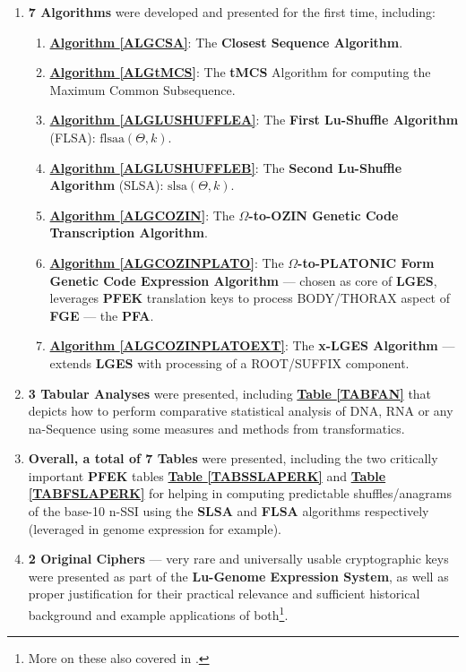 \documentclass[a4paper, 18pt]{book} %
\begin{document}
\begin{enumerate}
{ }
\item{\textbf{7 Algorithms} were developed and presented for the first time, including:
	\begin{enumerate}
	\item \textbf{\hyperref[ALGCSA]{Algorithm \ref{ALGCSA}}}: The \textbf{Closest Sequence Algorithm}.
	\item \textbf{\hyperref[ALGtMCS]{Algorithm \ref{ALGtMCS}}}: The \textbf{tMCS} Algorithm for computing the Maximum Common Subsequence.
		\item \textbf{\hyperref[ALGLUSHUFFLEA]{Algorithm \ref{ALGLUSHUFFLEA}}}: The \textbf{First Lu-Shuffle Algorithm} (FLSA): $\text{flsaa}(\Theta, k)$.
	\item \textbf{\hyperref[ALGLUSHUFFLEB]{Algorithm \ref{ALGLUSHUFFLEB}}}: The \textbf{Second Lu-Shuffle Algorithm} (SLSA): $\text{slsa}(\Theta, k)$.
	\item \textbf{\hyperref[ALGCOZIN]{Algorithm \ref{ALGCOZIN}}}: The \textbf{$\Omega$-to-OZIN Genetic Code Transcription Algorithm}.
	\item \textbf{\hyperref[ALGCOZINPLATO]{Algorithm \ref{ALGCOZINPLATO}}}: The \textbf{$\Omega$-to-PLATONIC Form Genetic Code Expression Algorithm} --- chosen as core of \textbf{LGES}, leverages \textbf{PFEK} translation keys to process BODY/THORAX aspect of \textbf{FGE} --- the \textbf{PFA}.
	\item \textbf{\hyperref[ALGCOZINPLATOEXT]{Algorithm \ref{ALGCOZINPLATOEXT}}}: The \textbf{x-LGES Algorithm} --- extends \textbf{LGES} with processing of a ROOT/SUFFIX component.
	\end{enumerate}
}
\item \textbf{3 Tabular Analyses}  were presented, including \textbf{\hyperref[TABFAN]{Table \ref{TABFAN}}} that depicts how to perform comparative statistical analysis of DNA, RNA or any na-Sequence using some measures and methods from transformatics.
\item \textbf{Overall, a total of 7 Tables} were presented, including the two critically important \textbf{PFEK} tables \textbf{\hyperref[TABSSLAPERK]{Table \ref{TABSSLAPERK}}} and \textbf{\hyperref[TABFSLAPERK]{Table \ref{TABFSLAPERK}}} for helping in computing predictable shuffles/anagrams of the base-10 n-SSI using the \textbf{SLSA} and \textbf{FLSA} algorithms respectively (leveraged in genome expression for example).
\item{ \textbf{2 Original Ciphers} --- very rare and universally usable cryptographic keys were presented as part of the \textbf{Lu-Genome Expression System}, as well as proper justification for their practical relevance and sufficient historical background and example applications of both\footnote{More on these also covered in \cite{lutalo_2025_grimlumtauto}.}.

}
\end{enumerate}
\end{document}
